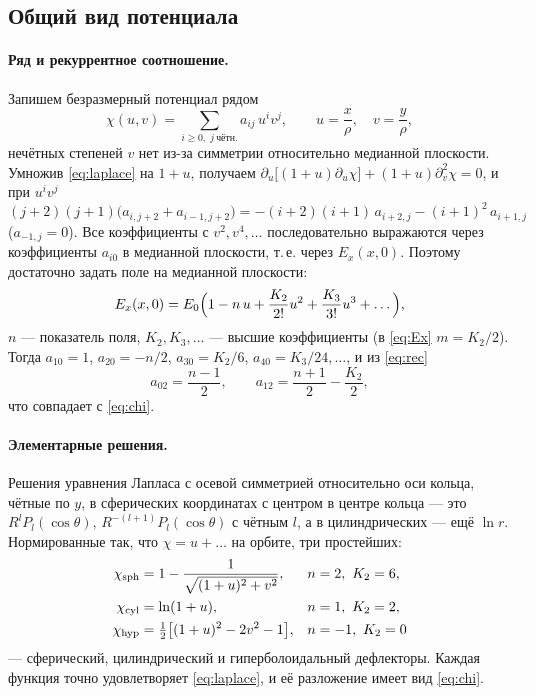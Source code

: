 \documentclass[12pt,a4paper]{article}
\numberwithin{equation}{section}
\begin{document}
\subsection{Общий вид потенциала}

\paragraph{Ряд и рекуррентное соотношение.} Запишем безразмерный потенциал рядом
\begin{equation}\label{eq:series}
\chi(u,v)=\sum_{i\ge0,\;j\ \text{чётн.}}a_{ij}\,u^iv^j,\qquad u=\frac x\rho,\quad v=\frac y\rho,
\end{equation}
нечётных степеней $v$ нет из-за симметрии относительно медианной плоскости. Умножив
\eqref{eq:laplace} на $1+u$, получаем
$\partial_u\bigl[(1+u)\partial_u\chi\bigr]+(1+u)\partial_v^2\chi=0$, и при $u^iv^j$
\begin{equation}\label{eq:rec}
\boxed{(j+2)(j+1)\bigl(a_{i,j+2}+a_{i-1,j+2}\bigr)
=-(i+2)(i+1)\,a_{i+2,j}-(i+1)^2\,a_{i+1,j}}
\end{equation}
($a_{-1,j}=0$). Все коэффициенты с $v^2,v^4,\dots$ последовательно выражаются через
коэффициенты $a_{i0}$ в медианной плоскости, т.\,е. через $E_x(x,0)$. Поэтому достаточно
задать поле на медианной плоскости:
\begin{equation}\label{eq:Ex-gen}
E_x(x,0)=E_0\Bigl(1-n\,u+\frac{K_2}{2!}u^2+\frac{K_3}{3!}u^3+\dots\Bigr),
\end{equation}
$n$ --- показатель поля, $K_2,K_3,\dots$ --- высшие коэффициенты (в \eqref{eq:Ex} $m=K_2/2$).
Тогда $a_{10}=1$, $a_{20}=-n/2$, $a_{30}=K_2/6$, $a_{40}=K_3/24,\dots$, и из \eqref{eq:rec}
\begin{equation}
a_{02}=\frac{n-1}{2},\qquad a_{12}=\frac{n+1}{2}-\frac{K_2}{2},
\end{equation}
что совпадает с \eqref{eq:chi}.

\paragraph{Элементарные решения.} Решения уравнения Лапласа с осевой симметрией относительно
оси кольца, чётные по $y$, в сферических координатах с центром в центре кольца --- это
$R^{l}P_l(\cos\theta)$, $R^{-(l+1)}P_l(\cos\theta)$ с чётным $l$, а в цилиндрических ---
ещё $\ln r$. Нормированные так, что $\chi=u+\dots$ на орбите, три простейших:
\begin{equation}\label{eq:basis}
\begin{aligned}
\chi_{\rm sph}&=1-\frac{1}{\sqrt{(1+u)^2+v^2}}, & n&=2,\ K_2=6,\\
\chi_{\rm cyl}&=\ln(1+u), & n&=1,\ K_2=2,\\
\chi_{\rm hyp}&=\tfrac12\bigl[(1+u)^2-2v^2-1\bigr], & n&=-1,\ K_2=0
\end{aligned}
\end{equation}
--- сферический, цилиндрический и гиперболоидальный дефлекторы. Каждая функция точно
удовлетворяет \eqref{eq:laplace}, и её разложение имеет вид \eqref{eq:chi}.
\end{document}
